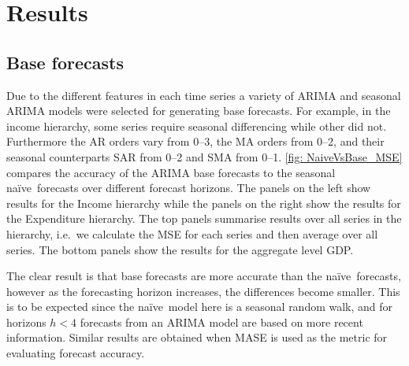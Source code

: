 \documentclass[graybox]{svmult}
\def\naive{na\"{i}ve\ }
\begin{document}
%
%
%
%

\section{Results}\label{sec:results}

\subsection{Base forecasts}

Due to the different features in each time series a variety of ARIMA and seasonal ARIMA models were selected for generating base forecasts. For example, in the income hierarchy, some series require seasonal differencing while other did not. Furthermore the AR orders vary from 0--3, the MA orders from 0--2, and their seasonal counterparts SAR from 0--2 and SMA from 0--1. \autoref{fig: NaiveVsBase_MSE} compares the accuracy of the ARIMA base forecasts to the seasonal \naive forecasts over different forecast horizons. The panels on the left show results for the Income hierarchy while the panels on the right show the results for the Expenditure hierarchy. The top panels summarise results over all series in the hierarchy, i.e.\ we calculate the MSE for each series and then average over all series. The bottom panels show the results for the aggregate level GDP.

The clear result is that base forecasts are more accurate than the \naive forecasts, however as the forecasting horizon increases, the differences become smaller. This is to be expected since the \naive model here is a seasonal random walk, and for horizons $h<4$ forecasts from an ARIMA model are based on more recent information. Similar results are obtained when MASE is used as the metric for evaluating forecast accuracy.
\end{document}
